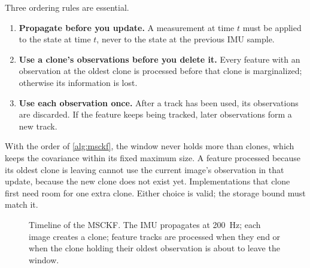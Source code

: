 Three ordering rules are essential.
\begin{enumerate}
  \item \textbf{Propagate before you update.} A measurement at time $t$ must be applied to the state at time $t$, never to the
        state at the previous IMU sample.
  \item \textbf{Use a clone's observations before you delete it.} Every feature with an observation at the oldest clone is
        processed before that clone is marginalized; otherwise its information is lost.
  \item \textbf{Use each observation once.} After a track has been used, its observations are discarded. If the feature keeps
        being tracked, later observations form a new track.
\end{enumerate}
With the order of \cref{alg:msckf}, the window never holds more than  clones, which keeps the covariance within its
fixed maximum size. A feature processed because its oldest clone is leaving cannot use the current image's observation in that
update, because the new clone does not exist yet. Implementations that clone first need room for one extra clone. Either
choice is valid; the storage bound must match it.

\begin{figure}[t]
\centering
{}
\caption{Timeline of the MSCKF. The IMU propagates at 200~Hz; each image creates a clone; feature tracks are processed when
they end or when the clone holding their oldest observation is about to leave the window.}
\label{fig:timeline}
\end{figure}

